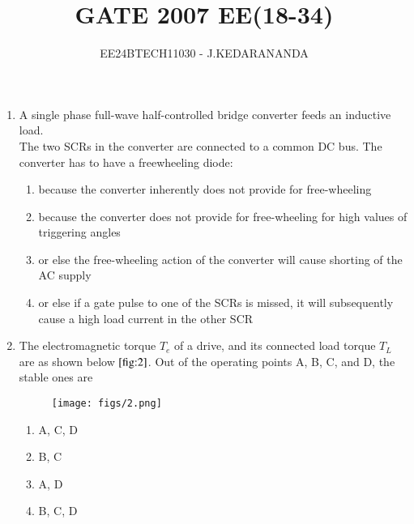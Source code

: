 \documentclass[journal]{IEEEtran}
\renewcommand{\thefigure}{\theenumi}
\renewcommand{\thetable}{\theenumi}
\numberwithin{equation}{enumi}
\numberwithin{figure}{enumi}
\renewcommand{\thetable}{\theenumi}
\begin{document}

\vspace{3cm}

\title{GATE 2007 EE(18-34)}
\author{EE24BTECH11030 - J.KEDARANANDA}
{\let\newpage\relax\maketitle}
\renewcommand{\thefigure}{\theenumi}
\renewcommand{\thetable}{\theenumi}
\begin{enumerate}
    \item A single phase full-wave half-controlled bridge converter feeds an inductive load. \\The two SCRs in the converter are connected to a common DC bus. The converter has to have a freewheeling diode:
    \begin{enumerate}
        \item  because the converter inherently does not provide for free-wheeling
        \item  because the converter does not provide for free-wheeling for high values of triggering angles
        \item  or else the free-wheeling action of the converter will cause shorting of the AC supply
        \item  or else if a gate pulse to one of the SCRs is missed, it will subsequently cause a high load current in the other SCR
    \end{enumerate}
    \bigskip
    \item The electromagnetic torque $T_e$ of a drive, and its connected load torque $T_L$ are as shown below $\ref{fig:2}$. Out of the operating points A, B, C, and D, the stable ones are
    \begin{figure}[!ht]
    \centering
    \texttt{[image: figs/2.png]}
    \caption{}
    \label{fig:2}
    \end{figure}
\begin{multicols}{4}
\begin{enumerate}
    \item A, C, D
    \item B, C
    \item A, D
    \item B, C, D
\end{enumerate}
\end{multicols}

\end{enumerate}
\end{document}
